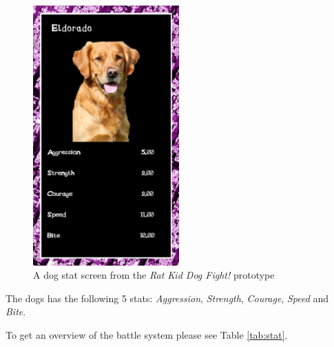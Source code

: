 \begin{figure}[h!]
	\centering
    \includegraphics[width=0.5\textwidth]{DogStats.png}
    \caption{A dog stat screen from the \textit{Rat Kid Dog Fight!} prototype}
    \label{fig:DogStatScreen}
\end{figure}


The dogs has the following 5 stats: \textit{Aggression}, \textit{Strength}, \textit{Courage}, \textit{Speed} and \textit{Bite}.\

To get an overview of the battle system please see Table \ref{tab:stat}.

